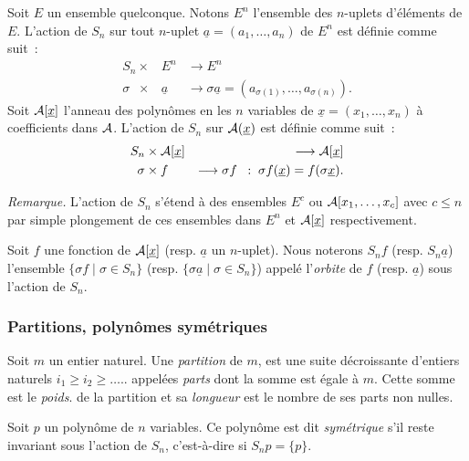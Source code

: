 Soit $E$ un ensemble quelconque. Notons $E^n$ l'ensemble des
$n$-uplets d'\'el\'ements de $E$. L'action de $S_n$ sur tout $n$-uplet
$\underline a=(a_1,\ldots,a_n)$ de $E^n$ est d\'efinie comme suit~:
\begin{eqnarray*}
            S_n   \times & E^n &\longrightarrow  E^n\\
           \sigma \;\; \times & {\underline a} &  \longrightarrow 
                      \sigma{\underline a}=(a_{\sigma (1)},\ldots,a_{\sigma (n)}).
\end{eqnarray*}
Soit ${\cal A}[\underline x]$ l'anneau des polyn\^omes
en les $n$ variables
de $\underline x=(x_1,\ldots ,x_n)$ \`a coefficients dans $\cal A$. 
L'action de $S_n$ sur ${\cal A}(\underline x)$ est d\'efinie
comme suit~: 
\begin{eqnarray*}
            S_n & \times {\cal A}[\underline x] & \longrightarrow  {\cal A}[\underline x]\\
           \sigma & \times f  & \longrightarrow  \sigma f \;\; :\;
                      \sigma f({\underline x})=f(\sigma{\underline x}).
\end{eqnarray*}

{\it Remarque.} L'action de $S_n$ s'\'etend \`a des ensembles $E^c$
ou ${\cal A}[x_1,\ldots ,x_c]$ avec $c \leq n$ par simple 
plongement de ces ensembles dans $E^n$ et ${\cal A}[\underline x]$ 
respectivement.

Soit $f$ une fonction de ${\cal A}[\underline x]$ (resp. $\underline a$ un
$n$-uplet). Nous noterons $S_nf$ (resp. $S_n \underline a$) l'ensemble
$\{\sigma f \;|\; \sigma \in S_n \}$ (resp. $\{\sigma\underline a \;|\;
 \sigma
\in S_n \}$) appel\'e l'{\it orbite} de $f$ (resp. $\underline a$)
sous l'action de $S_n$.

\subsubsection*{Partitions, polyn\^omes sym\'etriques}

Soit $m$ un entier naturel.
Une {\it partition} de $m$, est une suite 
d\'ecroissante d'entiers naturels $i_1\geq i_2 \geq \ldots..$ appel\'ees 
{\it parts} dont la somme est \'egale \`a $m$. Cette somme est le {\it poids}.
de la partition et sa {\it longueur} est le nombre de ses parts non nulles.

Soit $p$ un polyn\^ome de $n$ variables. Ce polyn\^ome est dit {\it
sym\'etrique} s'il reste invariant sous l'action de $S_n$, c'est-\`a-dire si
$S_n p =\{
p\}$.

